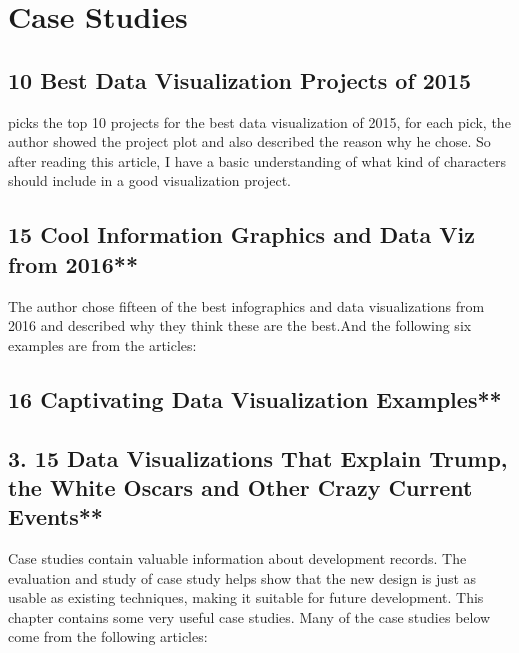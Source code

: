 \documentclass[]{book}
\theoremstyle{definition}
\theoremstyle{definition}
\theoremstyle{definition}
\theoremstyle{remark}
\begin{document}
\chapter{Case Studies}\label{case-studies}

\section{10 Best Data Visualization Projects of
2015}\label{best-data-visualization-projects-of-2015}

\citep{10_BEST} picks the top 10 projects for the best data
visualization of 2015, for each pick, the author showed the project plot
and also described the reason why he chose. So after reading this
article, I have a basic understanding of what kind of characters should
include in a good visualization project.

\section{\texorpdfstring{15 Cool Information Graphics and Data Viz from
2016**
\citep{cool_data}}{15 Cool Information Graphics and Data Viz from 2016** {[}@cool\_data{]}}}\label{cool-information-graphics-and-data-viz-from-2016-cool_data}

The author chose fifteen of the best infographics and data
visualizations from 2016 and described why they think these are the
best.And the following six examples are from the articles:

\section{\texorpdfstring{16 Captivating Data Visualization Examples**
\citep{int_viz_capt}}{16 Captivating Data Visualization Examples** {[}@int\_viz\_capt{]}}}\label{captivating-data-visualization-examples-int_viz_capt}

\section{\texorpdfstring{3. 15 Data Visualizations That Explain Trump,
the White Oscars and Other Crazy Current Events**
\citep{int_viz_2}}{3. 15 Data Visualizations That Explain Trump, the White Oscars and Other Crazy Current Events** {[}@int\_viz\_2{]}}}\label{data-visualizations-that-explain-trump-the-white-oscars-and-other-crazy-current-events-int_viz_2}

Case studies contain valuable information about development records. The
evaluation and study of case study helps show that the new design is
just as usable as existing techniques, making it suitable for future
development. This chapter contains some very useful case studies. Many
of the case studies below come from the following articles:
\end{document}
